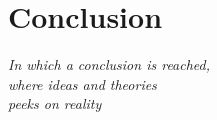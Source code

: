 \chapter{Conclusion}

\begin{flushright}{\slshape
    In which a conclusion is reached,\\
    where ideas and theories\\
    peeks on reality
}
\end{flushright}
